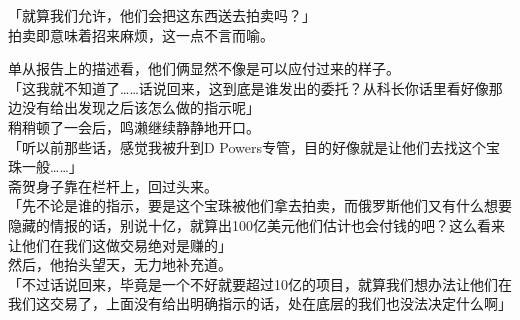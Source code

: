 「就算我们允许，他们会把这东西送去拍卖吗？」\\

拍卖即意味着招来麻烦，这一点不言而喻。

单从报告上的描述看，他们俩显然不像是可以应付过来的样子。\\

「这我就不知道了……话说回来，这到底是谁发出的委托？从科长你话里看好像那边没有给出发现之后该怎么做的指示呢」\\

稍稍顿了一会后，鸣濑继续静静地开口。\\

「听以前那些话，感觉我被升到D Powers专管，目的好像就是让他们去找这个宝珠一般……」\\

斋贺身子靠在栏杆上，回过头来。\\

「先不论是谁的指示，要是这个宝珠被他们拿去拍卖，而俄罗斯他们又有什么想要隐藏的情报的话，别说十亿，就算出100亿美元他们估计也会付钱的吧？这么看来让他们在我们这做交易绝对是赚的」\\

然后，他抬头望天，无力地补充道。\\

「不过话说回来，毕竟是一个不好就要超过10亿的项目，就算我们想办法让他们在我们这交易了，上面没有给出明确指示的话，处在底层的我们也没法决定什么啊」\\

